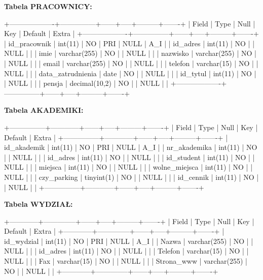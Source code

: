 \documentclass[12pt,a4paper]{article}
\newenvironment{sqltable}%
{\snugshade\verbatim}%
{\endverbatim\endsnugshade}
\begin{document}
\newpage

\textbf{Tabela PRACOWNICY:}

\begin{sqltable}
+-------------------+---------------+------+-----+---------+-------+
| Field             | Type          | Null | Key | Default | Extra |
+-------------------+---------------+------+-----+---------+-------+
| id_pracownik      | int(11)       | NO   | PRI | NULL    | A_I   |
| id_adres          | int(11)       | NO   |     | NULL    |       |
| imie              | varchar(255)  | NO   |     | NULL    |       |
| nazwisko          | varchar(255)  | NO   |     | NULL    |       |
| email             | varchar(255)  | NO   |     | NULL    |       |
| telefon           | varchar(15)   | NO   |     | NULL    |       |
| data_zatrudnienia | date          | NO   |     | NULL    |       |
| id_tytul          | int(11)       | NO   |     | NULL    |       |
| pensja            | decimal(10,2) | NO   |     | NULL    |       |
+-------------------+---------------+------+-----+---------+-------+
\end{sqltable}

\textbf{Tabela AKADEMIKI:}

\begin{sqltable}
+---------------+------------+------+-----+---------+-------+
| Field         | Type       | Null | Key | Default | Extra |
+---------------+------------+------+-----+---------+-------+
| id_akademik   | int(11)    | NO   | PRI | NULL    | A_I   |
| nr_akademika  | int(11)    | NO   |     | NULL    |       |
| id_adres      | int(11)    | NO   |     | NULL    |       |
| id_student    | int(11)    | NO   |     | NULL    |       |
| miejsca       | int(11)    | NO   |     | NULL    |       |
| wolne_miejsca | int(11)    | NO   |     | NULL    |       |
| czy_parking   | tinyint(1) | NO   |     | NULL    |       |
| id_cennik     | int(11)    | NO   |     | NULL    |       |
+---------------+------------+------+-----+---------+-------+
\end{sqltable}

\textbf{Tabela WYDZIAŁ:}

\begin{sqltable}
+------------+--------------+------+-----+---------+-------+
| Field      | Type         | Null | Key | Default | Extra |
+------------+--------------+------+-----+---------+-------+
| id_wydzial | int(11)      | NO   | PRI | NULL    | A_I   |
| Nazwa      | varchar(255) | NO   |     | NULL    |       |
| id_adres   | int(11)      | NO   |     | NULL    |       |
| Telefon    | varchar(15)  | NO   |     | NULL    |       |
| Fax        | varchar(15)  | NO   |     | NULL    |       |
| Strona_www | varchar(255) | NO   |     | NULL    |       |
+------------+--------------+------+-----+---------+-------+
\end{sqltable}
\end{document}
